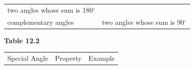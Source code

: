 {{\begin{center}
\begin{tabular}[t]{|l|l|l|}
    \multicolumn{2}{c|}{two angles whose sum is 180${}^{\circ }$}
     \tabularnewline\cline{1-1}\cline{2-2}\cline{3-3}
        complementary angles &
    \multicolumn{2}{c|}{two angles whose sum is 90${}^{\circ }$}
     \tabularnewline\cline{1-1}\cline{2-2}\cline{3-3}
    \end{tabular}
      \end{center}
    \begin{center}{\small\bfseries Table 12.2}\end{center}
          }{ %
        \begin{center}
      \label{m39370*id315548}
    \noindent
      \tablelasttail{}
      \begin{xtabular}[t]{|l|l|l|}\hline
        Special Angle &
        Property &
        Example%
     \tabularnewline{}

\end{xtabular}
\end{center}}}
